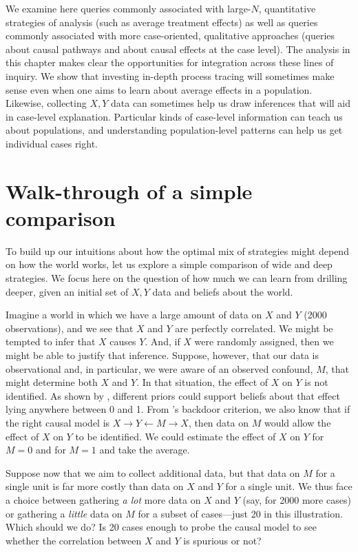 \documentclass[
  12pt,
]{book}
\begin{document}
We examine here queries commonly associated with large-\(N\), quantitative strategies of analysis (such as average treatment effects) as well as queries commonly associated with more case-oriented, qualitative approaches (queries about causal pathways and about causal effects at the case level). The analysis in this chapter makes clear the opportunities for integration across these lines of inquiry. We show that investing in-depth process tracing will sometimes make sense even when one aims to learn about average effects in a population. Likewise, collecting \(X, Y\) data can sometimes help us draw inferences that will aid in case-level explanation. Particular kinds of case-level information can teach us about populations, and understanding population-level patterns can help us get individual cases right.

\hypertarget{walk-through-of-a-simple-comparison}{%
\section{Walk-through of a simple comparison}\label{walk-through-of-a-simple-comparison}}

To build up our intuitions about how the optimal mix of strategies might depend on how the world works, let us explore a simple comparison of wide and deep strategies. We focus here on the question of how much we can learn from drilling deeper, given an initial set of \(X,Y\) data and beliefs about the world.

Imagine a world in which we have a large amount of data on \(X\) and \(Y\) (2000 observations), and we see that \(X\) and \(Y\) are perfectly correlated. We might be tempted to infer that \(X\) causes \(Y\). And, if \(X\) were randomly assigned, then we might be able to justify that inference. Suppose, however, that our data is observational and, in particular, we were aware of an observed confound, \(M\), that might determine both \(X\) and \(Y\). In that situation, the effect of \(X\) on \(Y\) is not identified. As shown by \citet{manski1995identification}, different priors could support beliefs about that effect lying anywhere between 0 and 1. From \citet{pearl2009causality}'s backdoor criterion, we also know that if the right causal model is \(X \rightarrow Y \leftarrow M \rightarrow X\), then data on \(M\) would allow the effect of \(X\) on \(Y\) to be identified. We could estimate the effect of \(X\) on \(Y\) for \(M=0\) and for \(M=1\) and take the average.

Suppose now that we aim to collect additional data, but that data on \(M\) for a single unit is far more costly than data on \(X\) and \(Y\) for a single unit. We thus face a choice between gathering \emph{a lot} more data on \(X\) and \(Y\) (say, for 2000 more cases) or gathering a \emph{little} data on \(M\) for a subset of cases---just 20 in this illustration. Which should we do? Is 20 cases enough to probe the causal model to see whether the correlation between \(X\) and \(Y\) is spurious or not?
\end{document}
